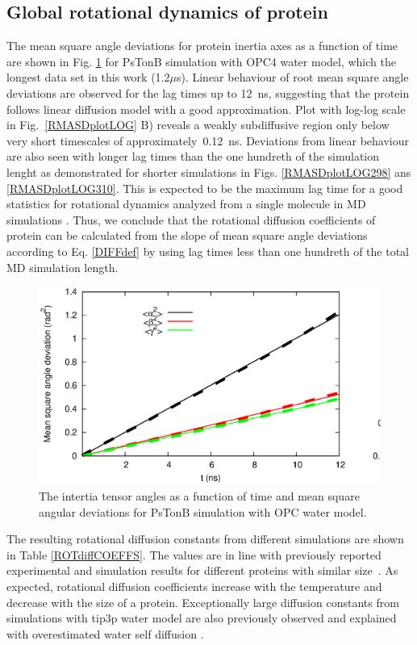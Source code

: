 \documentclass[pre,aps,floatfix,authordate1-4,twocolumn]{revtex4-1}
\begin{document}
\subsection{Global rotational dynamics of protein}
The mean square angle deviations for protein inertia axes
as a function of time are shown in Fig. \ref{RMASDplot}
for PsTonB simulation with OPC4 water model, which the longest
data set in this work (1.2$\mu$s).
Linear behaviour of root mean square angle deviations are observed
for the lag times up to 12~ns, suggesting that the protein follows linear diffusion model with a
good approximation. Plot with log-log scale in Fig.~\ref{RMASDplotLOG} B)
reveals a weakly subdiffusive region only below very short timescales
of approximately~0.12~ns. Deviations from linear behaviour are also
seen with longer lag times than the one hundreth of the simulation lenght as
demonstrated for shorter simulations in Figs. \ref{RMASDplotLOG298} ans \ref{RMASDplotLOG310}.
This is expected to be the maximum lag time for a good statistics
for rotational dynamics analyzed from a single molecule in MD simulations \cite{lu06}.
Thus, we conclude that the rotational diffusion coefficients of protein can
be calculated from the slope of mean square angle
deviations according to Eq. \ref{DIFFdef} by using lag times less than
one hundreth of the total MD simulation length.
\begin{figure}[htb]
  \includegraphics[width=16.5cm]{../Figs/RMASDplotPsTonBOPC4.eps}%
  \caption{The intertia tensor angles as a function of time and mean square angular
    deviations for PsTonB simulation with OPC water model.
    \label{RMASDplot}}%
\end{figure}

The resulting rotational diffusion constants from different simulations are
shown in Table \ref{ROTdiffCOEFFS}. The values are in line with
previously reported experimental and simulation results for different proteins
with similar size~\cite{wong08,krishnan98}. As expected,
rotational diffusion coefficients increase with the temperature and decrease with the
size of a protein.  Exceptionally large diffusion constants from simulations
with tip3p water model are also previously observed and explained with
overestimated water self diffusion \cite{wong08}.
\end{document}
